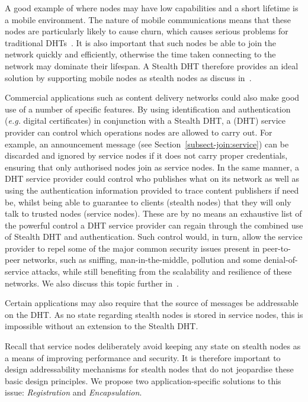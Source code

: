 \documentclass[letterpaper]{sig-alternate} %
\begin{document}
A good example of where nodes may have low capabilities and a short lifetime is
a mobile environment. The nature of mobile communications means that these
nodes are particularly likely to cause churn, which causes serious problems for
traditional DHTs~\cite{mobilechurn}. It is also important that such nodes be
able to join the network quickly and efficiently, otherwise the time taken
connecting to the network may dominate their lifespan. A Stealth DHT therefore
provides an ideal solution by supporting mobile nodes as stealth nodes as
discuss in~\cite{stealthpercom}.

Commercial applications such as content delivery networks could also
make good use of a number of specific features. By using identification
and authentication (\emph{e.g.} digital certificates) in conjunction
with a Stealth DHT, a (DHT) service provider can control which
operations nodes are allowed to carry out. For example, an announcement
message (see Section~\ref{subsect-join:service}) can be discarded and
ignored by service nodes if it does not carry proper credentials,
ensuring that only authorised nodes join as service nodes. In the same
manner, a DHT service provider could control who publishes what on its
network as well as using the authentication information provided to
trace content publishers if need be, whilst being able to guarantee to
clients (stealth nodes) that they will only talk to trusted nodes
(service nodes). These are by no means an exhaustive list of the
powerful control a DHT service provider can regain through the combined
use of Stealth DHT and authentication. Such control would, in turn,
allow the service provider to repel some of the major common security
issues present in peer-to-peer networks, such as sniffing,
man-in-the-middle, pollution and some denial-of-service attacks, while
still benefiting from the scalability and resilience of these networks.
We also discuss this topic further in~\cite{stealtheuromicro}.

Certain applications may also require that the source of messages be
addressable on the DHT. As no state regarding stealth nodes is stored
in service nodes, this is impossible without an extension to the
Stealth DHT.

Recall that service nodes deliberately avoid keeping any state on
stealth nodes as a means of improving performance and security. It
is therefore important to design addressability mechanisms for
stealth nodes that do not jeopardise these basic design principles.
We propose two application-specific solutions to this issue:
\emph{Registration} and \emph{Encapsulation}.
\end{document}
